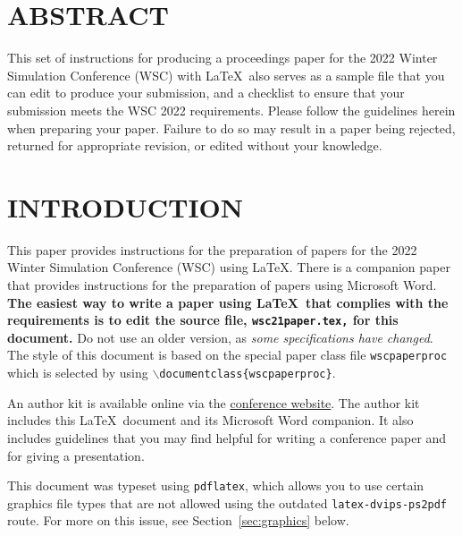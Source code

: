 \documentclass{wscpaperproc}
\theoremstyle{wsc}
\begin{document}
\maketitle

\section*{ABSTRACT}
This set of instructions for producing a proceedings paper for the 2022 Winter Simulation Conference (WSC) with \LaTeX\ also serves as a sample file that you can edit to produce your submission, and a checklist to ensure that your submission meets the WSC 2022 requirements. Please follow the guidelines herein when preparing your paper. Failure to do so may result in a paper being rejected, returned for appropriate revision, or edited without your knowledge.

\section{INTRODUCTION}
\label{sec:intro}

This paper provides instructions for the preparation of papers for the 2022
Winter Simulation Conference (WSC) using \LaTeX. There is a companion paper that
provides instructions for the preparation of papers using Microsoft Word. \textbf{The easiest way to write a paper using \LaTeX\ that complies with the
requirements is to edit the source file, {\tt wsc21paper.tex,} for this document.} 
Do not use an older version, as \textit{some specifications have changed}.
The style of this document is based on the special paper class file {\tt wscpaperproc} which is selected by using {\tt $\backslash$documentclass\{wscpaperproc\}}.

An author kit is available online via the \href{http://www.wintersim.org}%
{conference website}.
The author kit includes this \LaTeX\ document and its Microsoft Word companion.
It also includes guidelines that you may find helpful for writing a conference paper and for giving a presentation.

This document was typeset using {\tt pdflatex}, which allows you to use certain
graphics file types that are not allowed using the outdated {\tt latex-dvips-ps2pdf} route.
For more on this issue, see Section~\ref{sec:graphics} below.
\end{document}
